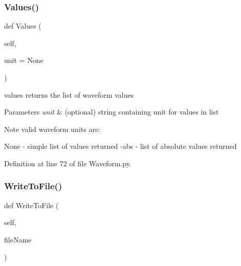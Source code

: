 \subsubsection{\texorpdfstring{Values()}{Values()}}
{\footnotesize\ttfamily def Values (\begin{DoxyParamCaption}\item[{}]{self,  }\item[{}]{unit = {\ttfamily None} }\end{DoxyParamCaption})}



values returns the list of waveform values 


\begin{DoxyParams}{Parameters}
{\em unit} & (optional) string containing unit for values in list \\
\hline
\end{DoxyParams}
\begin{DoxyNote}{Note}
valid waveform units are\+:
\begin{DoxyItemize}
\item None -\/ simple list of values returned -\/\textquotesingle{}abs\textquotesingle{} -\/ list of absolute values returned 
\end{DoxyItemize}
\end{DoxyNote}


Definition at line 72 of file Waveform.\+py.

\mbox{\label{classSignalIntegrity_1_1TimeDomain_1_1Waveform_1_1Waveform_1_1Waveform_a9bc60dff701312ba7ddf47ee941bbc8f}} 
\subsubsection{\texorpdfstring{Write\+To\+File()}{WriteToFile()}}
{\footnotesize\ttfamily def Write\+To\+File (\begin{DoxyParamCaption}\item[{}]{self,  }\item[{}]{file\+Name }\end{DoxyParamCaption})}



